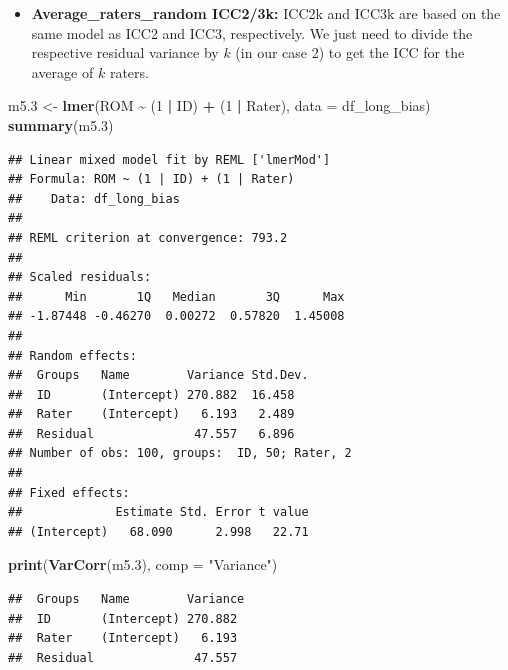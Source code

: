 \documentclass[
]{article}
\newenvironment{Shaded}{\begin{snugshade}}{\end{snugshade}}
\newcommand{\AttributeTok}[1]{\textcolor[rgb]{0.13,0.29,0.53}{#1}}
\newcommand{\DecValTok}[1]{\textcolor[rgb]{0.00,0.00,0.81}{#1}}
\newcommand{\FloatTok}[1]{\textcolor[rgb]{0.00,0.00,0.81}{#1}}
\newcommand{\FunctionTok}[1]{\textcolor[rgb]{0.13,0.29,0.53}{\textbf{#1}}}
\newcommand{\NormalTok}[1]{#1}
\newcommand{\OtherTok}[1]{\textcolor[rgb]{0.56,0.35,0.01}{#1}}
\newcommand{\SpecialCharTok}[1]{\textcolor[rgb]{0.81,0.36,0.00}{\textbf{#1}}}
\newcommand{\StringTok}[1]{\textcolor[rgb]{0.31,0.60,0.02}{#1}}
\providecommand{\tightlist}{%
  \setlength{\itemsep}{0pt}\setlength{\parskip}{0pt}}
\begin{document}
\begin{itemize}
\tightlist
\item
  \textbf{Average\_raters\_random ICC2/3k:}
  ICC2k and ICC3k are based on the same model as ICC2 and ICC3, respectively.
  We just need to divide the respective residual variance by \(k\) (in our case 2) to get
  the ICC for the average of \(k\) raters.
\end{itemize}

\begin{Shaded}
\begin{Highlighting}[]
\NormalTok{m5}\FloatTok{.3} \OtherTok{\textless{}{-}} \FunctionTok{lmer}\NormalTok{(ROM }\SpecialCharTok{\textasciitilde{}}\NormalTok{ (}\DecValTok{1} \SpecialCharTok{|}\NormalTok{ ID) }\SpecialCharTok{+}\NormalTok{ (}\DecValTok{1} \SpecialCharTok{|}\NormalTok{ Rater), }\AttributeTok{data =}\NormalTok{ df\_long\_bias)}
\FunctionTok{summary}\NormalTok{(m5}\FloatTok{.3}\NormalTok{)}
\end{Highlighting}
\end{Shaded}

\begin{verbatim}
## Linear mixed model fit by REML ['lmerMod']
## Formula: ROM ~ (1 | ID) + (1 | Rater)
##    Data: df_long_bias
## 
## REML criterion at convergence: 793.2
## 
## Scaled residuals: 
##      Min       1Q   Median       3Q      Max 
## -1.87448 -0.46270  0.00272  0.57820  1.45008 
## 
## Random effects:
##  Groups   Name        Variance Std.Dev.
##  ID       (Intercept) 270.882  16.458  
##  Rater    (Intercept)   6.193   2.489  
##  Residual              47.557   6.896  
## Number of obs: 100, groups:  ID, 50; Rater, 2
## 
## Fixed effects:
##             Estimate Std. Error t value
## (Intercept)   68.090      2.998   22.71
\end{verbatim}

\begin{Shaded}
\begin{Highlighting}[]
\FunctionTok{print}\NormalTok{(}\FunctionTok{VarCorr}\NormalTok{(m5}\FloatTok{.3}\NormalTok{), }\AttributeTok{comp =} \StringTok{"Variance"}\NormalTok{)}
\end{Highlighting}
\end{Shaded}

\begin{verbatim}
##  Groups   Name        Variance
##  ID       (Intercept) 270.882 
##  Rater    (Intercept)   6.193 
##  Residual              47.557
\end{verbatim}
\end{document}
